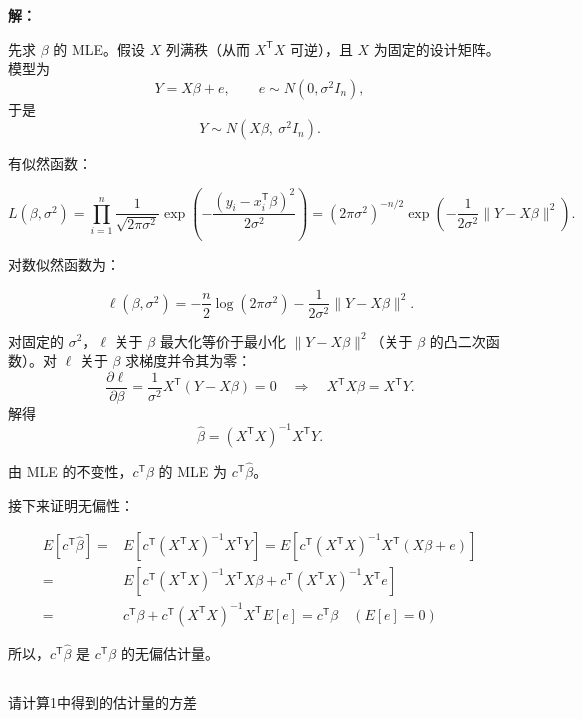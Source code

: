\documentclass[12pt,a4paper]{article}
\begin{document}
\begin{answerbox}
\textbf{解：}

先求 $\beta$ 的 MLE。假设 $X$ 列满秩（从而 $X^{\mathsf T}X$ 可逆），且 $X$ 为固定的设计矩阵。模型为
$$
Y=X\beta+e,\qquad e\sim N(0,\sigma^2 I_n),
$$
于是
$$
Y\sim N(X\beta,\ \sigma^2 I_n).
$$

有似然函数：

$$
L(\beta,\sigma^2)=\prod_{i=1}^{n}\frac{1}{\sqrt{2\pi\sigma^2}}
\exp\left(-\frac{(y_i-x_i^{\mathsf{T}}\beta)^2}{2\sigma^2}\right)
=(2\pi\sigma^2)^{-n/2}\exp\left(-\frac{1}{2\sigma^2}\|Y-X\beta\|^2\right).
$$

对数似然函数为：

$$
\ell(\beta,\sigma^2)
=-\frac{n}{2}\log(2\pi\sigma^2)-\frac{1}{2\sigma^2}\|Y-X\beta\|^2 .
$$

对固定的 $\sigma^2$，$\ell$ 关于 $\beta$ 最大化等价于最小化 $\|Y-X\beta\|^2$（关于 $\beta$ 的凸二次函数）。对 $\ell$ 关于 $\beta$ 求梯度并令其为零：
$$
\frac{\partial \ell}{\partial\beta}
=\frac{1}{\sigma^2}X^{\mathsf{T}}(Y-X\beta)=0
\quad\Longrightarrow\quad
X^{\mathsf{T}}X\beta=X^{\mathsf{T}}Y .
$$
解得
$$
\hat{\beta}=(X^{\mathsf{T}}X)^{-1}X^{\mathsf{T}}Y .
$$

由 MLE 的不变性，$c^{\mathsf T}\beta$ 的 MLE 为 $c^{\mathsf T}\hat{\beta}$。

接下来证明无偏性：

$$
\begin{aligned}
E\left[c^{\mathsf T}\hat{\beta}\right]
=&E\left[c^{\mathsf T}(X^{\mathsf T}X)^{-1}X^{\mathsf T}Y\right]=E\left[c^{\mathsf T}(X^{\mathsf T}X)^{-1}X^{\mathsf T}(X\beta+e)\right]\\
=&E\left[c^{\mathsf T}(X^{\mathsf T}X)^{-1}X^{\mathsf T}X\beta+c^{\mathsf T}(X^{\mathsf T}X)^{-1}X^{\mathsf T}e\right]\\
=&c^{\mathsf T}\beta+c^{\mathsf T}(X^{\mathsf T}X)^{-1}X^{\mathsf T}E\left[e\right]=c^{\mathsf T}\beta\quad\left(E\left[e\right]=0\right)
\end{aligned}
$$

所以，$c^{\mathsf T}\hat{\beta}$ 是 $c^{\mathsf T}\beta$ 的无偏估计量。
\end{answerbox}

\subsection{}

请计算1中得到的估计量的方差
\end{document}

